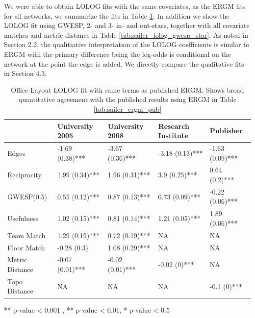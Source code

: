 \documentclass[
]{statsoc}
\begin{document}
We were able to obtain LOLOG fits with the same covariates, as the ERGM
fits for all networks, we summarize the fits in Table
\ref{tab:sailer_lolog_pub}. In addition we show the LOLOG fit using
GWESP, 2- and 3- in- and out-stars, together with all covariate matches
and metric distance in Table \ref{tab:sailer_lolog_gwesp_star}. As noted
in Section 2.2, the qualitiative interpretation of the LOLOG
coefficients is similar to ERGM with the primary difference being the
log-odds is conditional on the network at the point the edge is added.
We directly compare the qualitative fits in Section 4.3.

\begin{table}

\caption{\label{tab:unnamed-chunk-3}\label{tab:sailer_lolog_pub}Office Layout LOLOG fit with same terms as published ERGM. Shows broad quantitative agreement with the published results using ERGM in Table \ref{tab:sailer_ergm_pub}}
\centering
\begin{threeparttable}
\begin{tabular}[t]{lllll}
\toprule
  & University 2005 & University 2008 & Research Institute & Publisher\\
\midrule
\rowcolor{gray!6}  Edges & -1.69 (0.38)*** & -3.67 (0.36)*** & -3.18 (0.13)*** & -1.63 (0.09)***\\
Reciprocity & 1.99 (0.34)*** & 1.96 (0.31)*** & 3.9 (0.25)*** & 0.64 (0.2)***\\
\rowcolor{gray!6}  GWESP(0.5) & 0.55 (0.12)*** & 0.87 (0.13)*** & 0.73 (0.09)*** & -0.22 (0.06)***\\
Usefulness & 1.02 (0.15)*** & 0.81 (0.14)*** & 1.21 (0.05)*** & 1.89 (0.06)***\\
\rowcolor{gray!6}  Team Match & 1.29 (0.19)*** & 0.72 (0.19)*** & NA & NA\\
\addlinespace
Floor Match & -0.28 (0.3) & 1.08 (0.29)*** & NA & NA\\
\rowcolor{gray!6}  Metric Distance & -0.07 (0.01)*** & -0.02 (0.01)*** & -0.02 (0)*** & NA\\
Topo Distance & NA & NA & NA & -0.1 (0)***\\
\bottomrule
\end{tabular}
\begin{tablenotes}
\item *** p-value < 0.001 , ** p-value < 0.01, * p-value < 0.5
\end{tablenotes}
\end{threeparttable}
\end{table}
\end{document}
